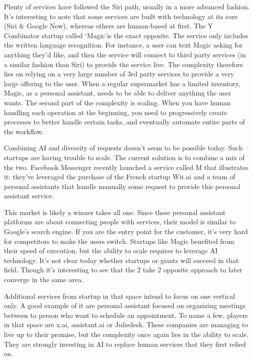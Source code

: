 \documentclass[12pt]{article}
\begin{document}
Plenty of services have followed the Siri path, usually in a more advanced
fashion. It's interesting to note that some services are built with technology
at its core (Siri \& Google Now), whereas others are human-based at first. The Y
Combinator startup called \lq Magic\rq  is the exact opposite. The service only
includes the written language recognition. For instance, a user can text Magic
asking for anything they'd like, and then the service will connect to third
party services (in a similar fashion than Siri) to provide the service live. The
complexity therefore lies on relying on a very large number of 3rd party
services to provide a very large offering to the user. When a regular supermarket
has a limited inventory, Magic, as a personal assistant, needs to be able to
deliver anything the user wants. The second part of the complexity is scaling.
When you have human handling each operation at the beginning, you need to
progressively create processes to better handle certain tasks, and eventually
automate entire parts of the workflow.

Combining AI and diversity of requests doesn't seem to be possible today. Such
startups are having trouble to scale. The current solution is to combine a mix
of the two. Facebook Messenger recently launched a service called M that
illustrates it: they've leveraged the purchase of the French startup Wit.ai and
a team of personal assistants that handle manually some request to provide this
personal assistant service.

This market is likely a winner takes all one. Since these personal assistant
platforms are about connecting people with services, their model is similar to
Google's search engine. If you are the entry point for the customer, it's very
hard for competitors to make the users switch. Startups like Magic benefited
from their speed of execution, but the ability to scale requires to leverage AI
technology. It's not clear today whether startups or giants will succeed in that
field. Though it's interesting to see that the 2 take 2 opposite approach to
later converge in the same area.

Additional services from startup in that space intend to focus on one vertical
only. A good example of it are personal assistant focused on organizing meetings
between to person who want to schedule an appointment. To name a few, players in
that space are x.ai, assistant.ai or Juliedesk. These companies are managing to
live up to their promise, but the complexity once again lies in the ability to
scale. They are strongly investing in AI to replace human services that they
first relied on.
\end{document}
